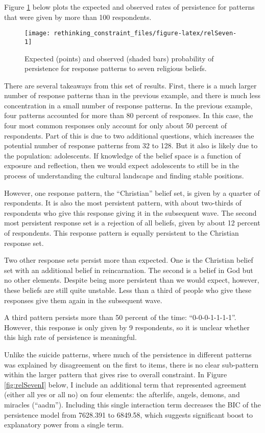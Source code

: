 \documentclass[12pt,]{article}
\begin{document}
Figure \ref{fig:relSeven} below plots the expected and observed rates of persistence for patterns that were given by more than 100 respondents.

\begin{figure}[t]
\texttt{[image: rethinking\_constraint\_files/figure-latex/relSeven-1]} \caption{Expected (points) and observed (shaded bars) probability of persistence for response patterns to seven religious beliefs.}\label{fig:relSeven}
\end{figure}

There are several takeaways from this set of results. First, there is a much larger number of response patterns than in the previous example, and there is much less concentration in a small number of response patterns. In the previous example, four patterns accounted for more than 80 percent of responses. In this case, the four most common responses only account for only about 50 percent of respondents. Part of this is due to two additional questions, which increases the potential number of response patterns from 32 to 128. But it also is likely due to the population: adolescents. If knowledge of the belief space is a function of exposure and reflection, then we would expect adolescents to still be in the process of understanding the cultural landscape and finding stable positions.

However, one response pattern, the ``Christian'' belief set, is given by a quarter of respondents. It is also the most persistent pattern, with about two-thirds of respondents who give this response giving it in the subsequent wave. The second most persistent response set is a rejection of all beliefs, given by about 12 percent of respondents. This response pattern is equally persistent to the Christian response set.

Two other response sets persist more than expected. One is the Christian belief set with an additional belief in reincarnation. The second is a belief in God but no other elements. Despite being more persistent than we would expect, however, these beliefs are still quite unstable. Less than a third of people who give these responses give them again in the subsequent wave.

A third pattern persists more than 50 percent of the time: ``0-0-0-1-1-1-1''. However, this response is only given by 9 respondents, so it is unclear whether this high rate of persistence is meaningful.

Unlike the suicide patterns, where much of the persistence in different patterns was explained by disagreement on the first to items, there is no clear sub-pattern within the larger pattern that gives rise to overall constraint. In Figure \ref{fig:relSevenI} below, I include an additional term that represented agreement (either all yes or all no) on four elements: the afterlife, angels, demons, and miracles (``aadm''). Including this single interaction term decreases the BIC of the persistence model from 7628.391 to 6849.58, which suggests significant boost to explanatory power from a single term.
\end{document}
